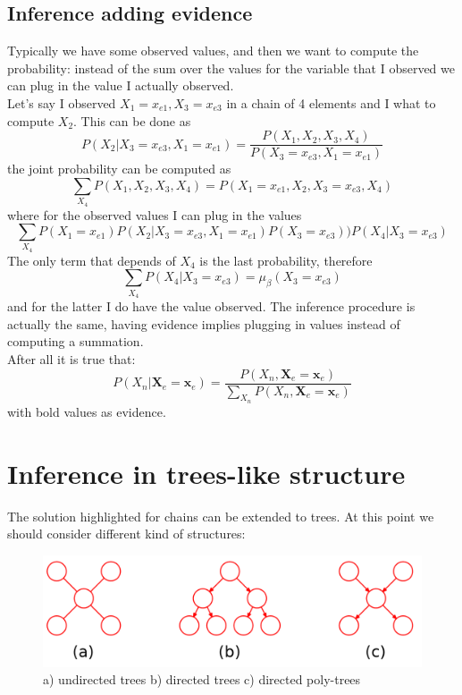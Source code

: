     \subsection{Inference adding evidence}
        Typically we have some observed values, and then we want to compute the probability: instead of the sum over the values for the variable that I observed we can plug in the value I actually observed.\\
        Let's say I observed $X_1 = x_{e1}, X_3 = x_{e3}$ in a chain of 4 elements and I what to compute $X_2$. This can be done as
        $$P(X_2|X_3 = x_{e3}, X_1 = x_{e1}) = \frac{P(X_1, X_2, X_3, X_4)}{P(X_3 = x_{e3}, X_1 = x_{e1})}$$
        the joint probability can be computed as
        $$\sum_{X_4} P(X_1, X_2, X_3, X_4) = P(X_1 = x_{e1}, X_2, X_3 = x_{e3}, X_4)$$ where for the observed values I can plug in the values
        $$\sum_{X_4} P(X_1 = x_{e1})P(X_2|X_3 = x_{e3}, X_1 = x_{e1})P(X_3 = x_{e3}))P(X_4|X_3 = x_{e3})$$
        The only term that depends of $X_4$ is the last probability, therefore
        $$\sum_{X_4} P(X_4|X_3 = x_{e3}) = \mu_\beta(X_3 = x_{e3})$$
        and for the latter I do have the value observed. 
        The inference procedure is actually the same, having evidence implies plugging in values instead of computing a summation.\\
        
        After all it is true that:
        \begin{equation}
            P(X_n|\textbf{X}_e = \textbf{x}_{e}) = \frac{P(X_n, \textbf{X}_e = \textbf{x}_{e})}{\sum_{X_n} P(X_n, \textbf{X}_e = \textbf{x}_e)}
        \end{equation}
        with bold values as evidence.
        
\section{Inference in trees-like structure}
    The solution highlighted for chains can be extended to trees. At this point we should consider different kind of structures:
    \begin{figure}
        \centering
        \includegraphics[scale=0.3]{images/trees_inferences.png}
        \caption{a) undirected trees b) directed trees c) directed poly-trees}
        \label{fig:trees_structure}
    \end{figure}
    

